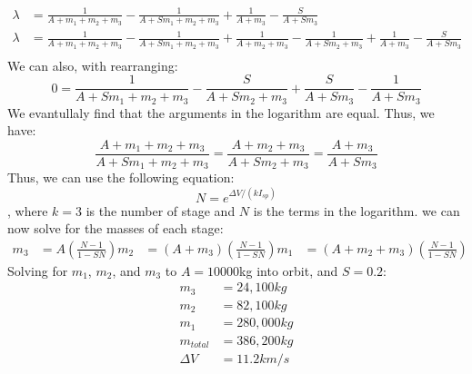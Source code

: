 \documentclass[11pt]{article}
\begin{document}
\begin{example}
\begin{align*}
        \lambda &= \frac{1}{A + m_1 + m_2 + m_3} - \frac{1}{A + Sm_1 + m_2 + m_3} + \frac{1}{A + m_3} - \frac{S}{A + Sm_3} \\ 
        \lambda &= \frac{1}{A + m_1 + m_2 + m_3} - \frac{1}{A + Sm_1 + m_2 + m_3} + \frac{1}{A + m_2 + m_3} - \frac{1}{A + Sm_2 + m_3} + \frac{1}{A + m_3} - \frac{S}{A + Sm_3} \\
        \end{align*}
    We can also, with rearranging:
    $$
    0 = \frac{1}{A + Sm_1 + m_2 + m_3} - \frac{S}{A + Sm_2 + m_3} + \frac{S}{A + Sm_3} - \frac{1}{A + Sm_3}
    $$ 
    We evantullaly find that the arguments in the logarithm are equal. Thus, we have:
    $$
    \frac{A + m_1 + m_2 + m_3}{A + Sm_1 + m_2 + m_3} = \frac{A + m_2 + m_3}{A + Sm_2 + m_3} = \frac{A + m_3}{A + Sm_3}
    $$
    Thus, we can use the following equation:
    \begin{equation}
        N = e^{\Delta V / (kI_{sp})}
    \end{equation}
    , where $k=3$ is the number of stage and $N$ is the terms in the logarithm. we can now solve for the masses of each stage:
    \begin{align*}
        m_3 &= A\left(\frac{N-1}{1-SN}\right)
        m_2 &= (A + m_3)\left(\frac{N-1}{1-SN}\right)
        m_1 &= (A + m_2 + m_3)\left(\frac{N-1}{1-SN}\right)
    \end{align*}
    Solving for $m_1$, $m_2$, and $m_3$ to $A=10000$kg into orbit, and $S=0.2$:
    \begin{align*}
        m_3 &= 24,100kg \\
        m_2 &= 82,100kg \\
        m_1 &= 280,000kg \\
        m_{total} &= 386,200kg \\
        \Delta V &= 11.2km/s
    \end{align*}
\end{example}
\end{document}

